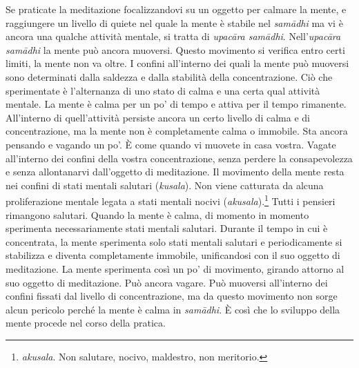 Se praticate la meditazione focalizzandovi su un oggetto per calmare la
mente, e raggiungere un livello di quiete nel quale la mente è stabile
nel \emph{samādhi} ma vi è ancora una qualche attività mentale, si
tratta di \emph{upacāra samādhi}. Nell'\emph{upacāra samādhi} la mente
può ancora muoversi. Questo movimento si verifica entro certi limiti, la
mente non va oltre. I confini all'interno dei quali la mente può
muoversi sono determinati dalla saldezza e dalla stabilità della
concentrazione. Ciò che sperimentate è l'alternanza di uno stato di
calma e una certa qual attività mentale. La mente è calma per un po' di
tempo e attiva per il tempo rimanente. All'interno di quell'attività
persiste ancora un certo livello di calma e di concentrazione, ma la
mente non è completamente calma o immobile. Sta ancora pensando e
vagando un po'. È come quando vi muovete in casa vostra. Vagate
all'interno dei confini della vostra concentrazione, senza perdere la
consapevolezza e senza allontanarvi dall'oggetto di meditazione. Il
movimento della mente resta nei confini di stati mentali salutari
(\emph{kusala}). Non viene catturata da alcuna proliferazione mentale
legata a stati mentali nocivi (\emph{akusala}).\footnote{\emph{akusala}.
  Non salutare, nocivo, maldestro, non meritorio.} Tutti i pensieri
rimangono salutari. Quando la mente è calma, di momento in momento
sperimenta necessariamente stati mentali salutari. Durante il tempo in
cui è concentrata, la mente sperimenta solo stati mentali salutari e
periodicamente si stabilizza e diventa completamente immobile,
unificandosi con il suo oggetto di meditazione. La mente sperimenta così
un po' di movimento, girando attorno al suo oggetto di meditazione. Può
ancora vagare. Può muoversi all'interno dei confini fissati dal livello
di concentrazione, ma da questo movimento non sorge alcun pericolo
perché la mente è calma in \emph{samādhi}. È così che lo sviluppo della
mente procede nel corso della pratica.

